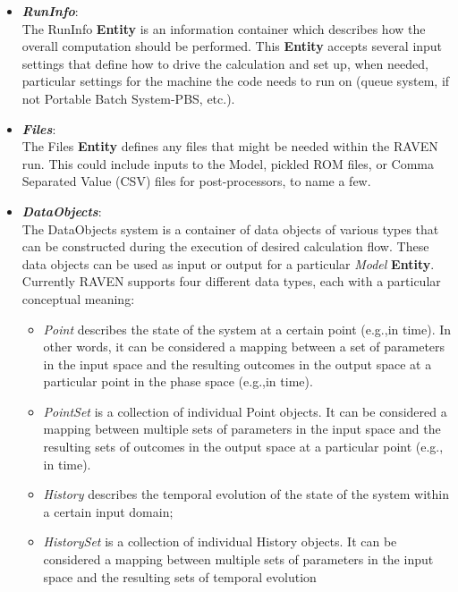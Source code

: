 \begin{itemize}
  \item \textit{\textbf{RunInfo}}: 
    \\The RunInfo \textbf{Entity} is an information container which describes how the overall computation should
      be performed. This \textbf{Entity}  accepts several input settings that define how to drive the calculation and set up, 
      when needed, particular settings for the machine the code needs to run on (queue system, if not Portable Batch System-PBS, etc.).  
  \item \textit{\textbf{Files}}: 
  \\ The Files \textbf{Entity}  defines any files that might be needed within the RAVEN run. This could include inputs to the   
      Model, pickled ROM files, or Comma Separated Value (CSV) files for post-processors, to name a few.
  \item \textit{\textbf{DataObjects}}: 
    \\The DataObjects system is a container of data objects of various types that can be constructed during the execution of 
    desired calculation flow. These data objects can be used as input or output for a particular \textit{Model} 
     \textbf{Entity}. Currently RAVEN supports four different data types, each with a particular conceptual meaning:
     \begin{itemize}
        \item \textit{Point} describes the state of the system at a certain point (e.g.,in time). In other words, it can be
                                       considered a mapping between a set of parameters in the input space and the resulting
                                       outcomes in the output space at a particular point in the phase space (e.g.,in time).
        \item \textit{PointSet} is a collection of individual Point objects. It can be considered a mapping between multiple
                                            sets of parameters in the input space and the resulting sets of outcomes in the output space
                                            at a particular point (e.g., in time).
        \item \textit{History} describes the temporal evolution of the state of the system within a certain input domain;
        \item \textit{HistorySet} is a collection of individual History objects. It can be considered a mapping between
                                               multiple sets of parameters in the input space and the resulting sets of temporal evolution

\end{itemize}
\end{itemize}
